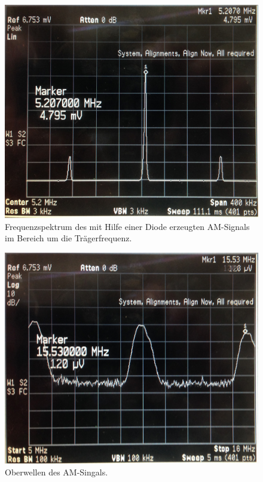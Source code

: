 \begin{figure}
    \centering
    \includegraphics[width=0.8\linewidth]{images/am-diode-spektrum.jpg}
    \caption{
        Frequenzspektrum des mit Hilfe einer Diode erzeugten AM-Signals im
        Bereich um die Trägerfrequenz.
    }
    \label{fig:am-diode-spektrum}
\end{figure}
\begin{figure}
    \centering
    \includegraphics[width=0.8\linewidth]{images/am-diode-oberwellen.jpg}
    \caption{
        Oberwellen des AM-Singals.
    }
    \label{fig:am-diode-oberwellen}
\end{figure}

